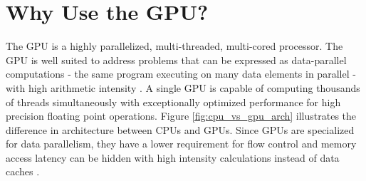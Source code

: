\section{Why Use the GPU?}
\label{sect:gpu_why_use_gpu}
The GPU is a highly parallelized, multi-threaded, multi-cored processor.  The GPU is well suited to address problems that can be expressed as data-parallel computations - the same program executing on many data elements in parallel - with high arithmetic intensity \cite{Nvidia08}.  A single GPU is capable of computing thousands of threads simultaneously with exceptionally optimized performance for high precision floating point operations.  Figure \ref{fig:cpu_vs_gpu_arch} illustrates the difference in architecture between CPUs and GPUs.  Since GPUs are specialized for data parallelism, they have a lower requirement for flow control and memory access latency can be hidden with high intensity calculations instead of data caches \cite{Nvidia08}.  

